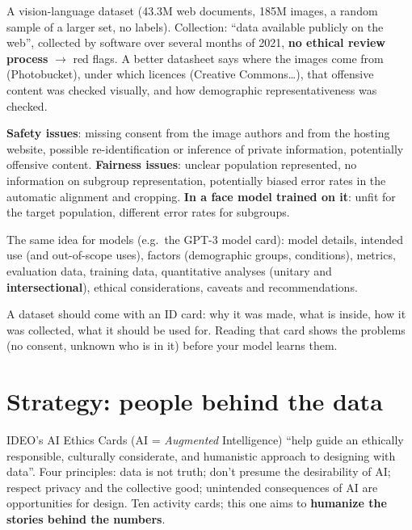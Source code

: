 \documentclass[11pt,a4paper,openany]{book}
\begin{document}
\begin{exbox}[title={Reading a datasheet: red flags}]
A vision-language dataset (43.3M web documents, 185M images, a random sample of a larger set, no
labels). Collection: ``data available publicly on the web'', collected by software over several
months of 2021, \textbf{no ethical review process} $\to$ red flags. A better datasheet says where
the images come from (Photobucket), under which licences (Creative Commons\ldots), that offensive
content was checked visually, and how demographic representativeness was checked.
\end{exbox}

\begin{exbox}[title={Case study: a dataset of human faces}]
\textbf{Safety issues}: missing consent from the image authors and from the hosting website,
possible re-identification or inference of private information, potentially offensive content.
\textbf{Fairness issues}: unclear population represented, no information on subgroup
representation, potentially biased error rates in the automatic alignment and cropping.
\textbf{In a face model trained on it}: unfit for the target population, different error rates
for subgroups.
\end{exbox}

\begin{rembox}[title={Model cards (Mitchell et al., 2019)}]
The same idea for models (e.g.\ the GPT-3 model card): model details, intended use (and
out-of-scope uses), factors (demographic groups, conditions), metrics, evaluation data, training
data, quantitative analyses (unitary and \textbf{intersectional}), ethical considerations,
caveats and recommendations.
\end{rembox}

\begin{goatbox}
A dataset should come with an ID card: why it was made, what is inside, how it was collected,
what it should be used for. Reading that card shows the problems (no consent, unknown who is in
it) before your model learns them.
\end{goatbox}


\section{Strategy: people behind the data}

\begin{defnbox}[title={People behind the data (IDEO AI Ethics Cards, 2019)}]
IDEO's AI Ethics Cards (AI = \emph{Augmented} Intelligence) ``help guide an ethically
responsible, culturally considerate, and humanistic approach to designing with data''. Four
principles: data is not truth; don't presume the desirability of AI; respect privacy and the
collective good; unintended consequences of AI are opportunities for design. Ten activity cards;
this one aims to \textbf{humanize the stories behind the numbers}.
\end{defnbox}
\end{document}
